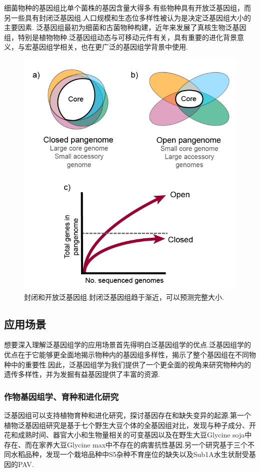 细菌物种的基因组比单个菌株的基因含量大得多.有些物种具有开放泛基因组，而另一些具有封闭泛基因组.人口规模和生态位多样性被认为是决定泛基因组大小的主要因素.
泛基因组最初为细菌和古菌物种构建，近年来发展了真核生物泛基因组，特别是植物物种.泛基因组动态与可移动元件有关，具有重要的进化背景意义，与宏基因组学相关，也在更广泛的基因组学背景中使用.


\begin{figure}[htp!]
	\centering
	\includegraphics[width=0.55\linewidth]{figure/open_close}
	\caption{封闭和开放泛基因组.封闭泛基因组趋于渐近，可以预测完整大小.} \label{open_close}
\end{figure}

\subsection{应用场景}

想要深入理解泛基因组学的应用场景首先得明白泛基因组学的优点.泛基因组学的优点在于它能够更全面地揭示物种内的基因组多样性，揭示了整个基因组在不同物种中的重要性.因此，泛基因组学为我们提供了一个更全面的视角来研究物种内的遗传多样性，并为发掘有益基因提供了丰富的资源.



\subsubsection{作物基因组学、育种和进化研究}

泛基因组可以支持植物育种和进化研究，探讨基因存在和缺失变异的起源.第一个植物泛基因组研究是基于七个野生大豆个体的全基因组对比，发现与种子成分、开花和成熟时间、器官大小和生物量相关的可变基因以及在野生大豆Glycine soja中存在、而在家养大豆Glycine max中不存在的病害抗性基因\cite{li2014novo}.另一个研究基于三个不同水稻品种，发现一个栽培品种中S5杂种不育座位的缺失以及Sub1A水生状耐受基因的PAV\cite{schatz2014whole}.

